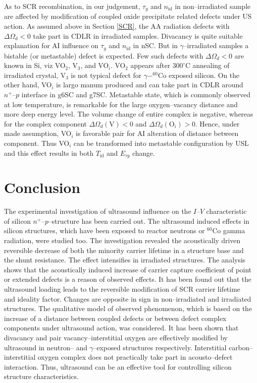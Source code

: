 \documentclass[aip,jap, amsmath,amssymb,reprint]{revtex4-1}
\begin{document}
As to SCR recombination, in our judgement, $\tau_g$ and $n_\mathrm{id}$ in non--irradiated sample
are affected by modification of coupled oxide precipitate related defects under US action.
As assumed above  in Section \ref{SCR},
the AA radiation defects with $\Delta\Omega_d<0$ take part in CDLR in irradiated samples.
Divacancy is quite suitable explanation for AI influence on $\tau_g$ and $n_\mathrm{id}$ in nSC.
But in $\gamma$--irradiated samples a bistable (or metastable) defect is expected.
Few such defects with $\Delta\Omega_d<0$ are known in Si,
viz VO$_2$,\cite{V2Obistable}
V$_3$,\cite{V3:Markevich}
and VO$_i$.\cite{Bistable:UFN}
VO$_2$ appears after $300^\circ$C annealing of irradiated crystal,
V$_3$ is not typical defect for $\gamma-^{60}$Co exposed silicon.
On the other hand, VO$_i$ is largo manum produced and can take part in CDLR around $n^+$--$p$
interface in g6SC and g7SC.
Metastable state, which is commonly observed at low temperature, is remarkable for the
large oxygen--vacancy distance and
more deep energy level.\cite{Bistable:UFN}
The volume change of entire complex is negative,
whereas for the complex component $\Delta\Omega_d(\mbox{V})<0$ and
$\Delta\Omega_d(\mbox{O}_i)>0$.
Hence, under made assumption, VO$_i$ is favorable pair for AI alteration of distance between component.
Thus VO$_i$ can be transformed into metastable configuration by USL and
this effect results in  both $T_{\mathrm{id}}$ and $E_{\tau g}$ change.



\section{Conclusion}
The experimental investigation of ultrasound influence on the $I$--$V$ characteristic of silicon $n^+$--$p$--structure has been carried out.
The ultrasound induced effects in silicon structures, which have been exposed to reactor neutrons or $^{60}$Co gamma radiation, were studied too.
The investigation revealed the acoustically driven reversible decrease of both the minority carrier lifetime in a structure base and the shunt resistance.
The effect intensifies in irradiated structures.
The analysis shows that the acoustically induced increase of carrier capture coefficient of point or extended defects is a reason of observed effects.
It has been found out that the ultrasound loading leads to the reversible modification of SCR carrier lifetime and ideality factor.
Changes are opposite in sign in non--irradiated and irradiated structures.
The qualitative model of observed phenomenon, which is based on the increase of a distance between coupled defects or between defect complex components under ultrasound action, was considered.
It has been shown that divacancy and pair vacancy--interstitial oxygen are effectively modified by ultrasound in neutron-- and $\gamma$--exposed structures respectively.
Interstitial carbon--interstitial oxygen complex does not practically take part in acousto--defect interaction.
Thus, ultrasound can be an effective tool for controlling silicon structure characteristics.


\end{document}
